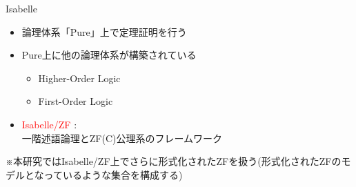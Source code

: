 \documentclass[17pt]{beamer}
\begin{document}
\begin{frame}{Isabelle} \, \vspace{-30pt}
    {\small \begin{itemize}[itemsep=5pt]
        \item 論理体系「Pure」上で定理証明を行う
        \item Pure上に他の論理体系が構築されている
              \begin{itemize}
                  \item Higher-Order Logic
                  \item First-Order Logic 
              \end{itemize} 
              \vspace{-10pt}
        \item \textcolor{red}{Isabelle/ZF} : \\
        一階述語論理とZF(C)公理系のフレームワーク
    \end{itemize} 
    \vspace{-10pt}
    \hspace{-0.5cm}※本研究ではIsabelle/ZF上でさらに形式化されたZFを扱う(形式化されたZFのモデルとなっているような集合を構成する)
    }
\end{frame}


\end{document}
